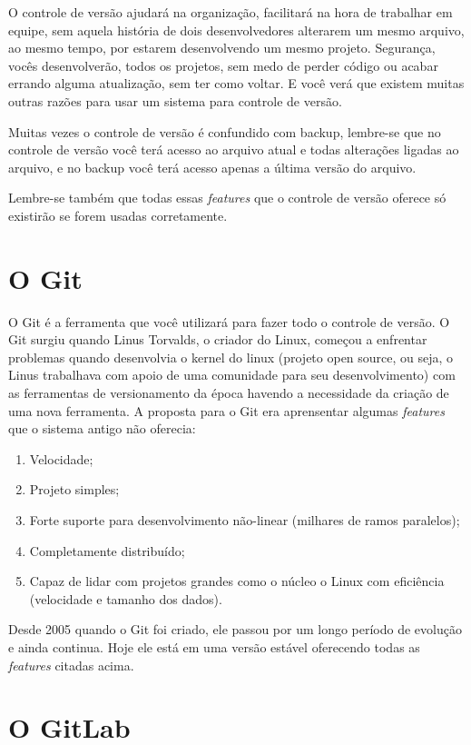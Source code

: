 \documentclass[12pt,openright,oneside,a4paper,english,brazil]{abntex2}
\begin{document}
O controle de versão ajudará na organização, facilitará na hora de trabalhar em equipe, sem aquela história de dois desenvolvedores alterarem um mesmo arquivo, ao mesmo tempo, por estarem desenvolvendo um mesmo projeto. Segurança, vocês desenvolverão, todos os projetos, sem medo de perder código ou acabar errando alguma atualização, sem ter como voltar. E você verá que existem muitas outras razões para usar um sistema para controle de versão.

Muitas vezes o controle de versão é confundido com backup, lembre-se que no controle de versão você terá acesso ao arquivo atual e todas alterações ligadas ao arquivo, e no backup você terá acesso apenas a última versão do arquivo.

Lembre-se também que todas essas \textit{features} que o controle de versão oferece só existirão se forem usadas corretamente.

\section{O Git}

O Git é a ferramenta que você utilizará para fazer todo o controle de versão. O Git surgiu quando Linus Torvalds, o criador do Linux, começou a enfrentar problemas quando desenvolvia o kernel do linux (projeto open source, ou seja, o Linus trabalhava com apoio de uma comunidade para seu desenvolvimento) com as ferramentas de versionamento da época havendo a necessidade da criação de uma nova ferramenta. A proposta para o Git era aprensentar algumas \textit{features} que o sistema antigo não oferecia:

\begin{enumerate}
	\item Velocidade;
	\item Projeto simples;
	\item Forte suporte para desenvolvimento não-linear (milhares de ramos paralelos);
	\item Completamente distribuído;
	\item Capaz de lidar com projetos grandes como o núcleo o Linux com eficiência (velocidade e tamanho dos dados).	
\end{enumerate}

Desde 2005 quando o Git foi criado, ele passou por um longo período de evolução e ainda continua. Hoje ele está em uma versão estável oferecendo todas as \textit{features} citadas acima.

\section{O GitLab}
\end{document}

